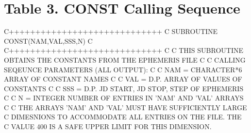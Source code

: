 \documentclass[twoside,11pt,nolof]{starlink}
\providecommand{\hdg}[1]{\vskip4pt plus2pt\leavevmode\kern-1em \underline{\large{#1}}\par}
\begin{document}
\section*{Table 3. CONST Calling Sequence}


\begin{terminalv}
C+++++++++++++++++++++++++++++
C
      SUBROUTINE CONST(NAM,VAL,SSS,N)
C
C+++++++++++++++++++++++++++++
C
C     THIS SUBROUTINE OBTAINS THE CONSTANTS FROM THE EPHEMERIS FILE
C
C     CALLING SEQEUNCE PARAMETERS (ALL OUTPUT):
C
C       NAM = CHARACTER*6 ARRAY OF CONSTANT NAMES
C
C       VAL = D.P. ARRAY OF VALUES OF CONSTANTS
C
C       SSS = D.P. JD START, JD STOP, STEP OF EPHEMERIS
C
C         N = INTEGER NUMBER OF ENTRIES IN 'NAM' AND 'VAL' ARRAYS
C
C     THE ARRAYS 'NAM' AND 'VAL' MUST HAVE SUFFICIENTLY LARGE
C     DIMESNIONS TO ACCOMMODATE ALL ENTRIES ON THE FILE. THE
C     VALUE 400 IS A SAFE UPPER LIMIT FOR THIS DIMENSION.
\end{terminalv}


\newpage                                               %


\end{document}

